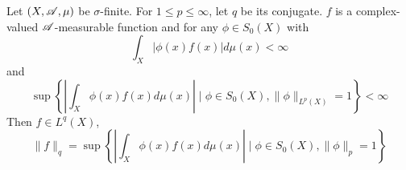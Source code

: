 \begin{thm}\label{thm:mqf}
	Let $(X,\mathscr{A},\mu)$ be $\sigma$-finite. For $1 \leq p \leq \infty$, let $q$ be its conjugate. $f$ is a complex-valued $\mathscr{A}$-measurable function and for any $\phi \in S_0(X)$ with
	\begin{equation*}
		\int_X|\phi(x) f(x)| d \mu(x)<\infty
	\end{equation*}
	and
	\begin{equation*}
		\sup \left\{\left|\int_X \phi(x) f(x) d \mu(x)\right| \mid \phi \in S_0(X),\|\phi\|_{L^p(X)}=1\right\}<\infty
	\end{equation*}
	Then $f \in L^q(X)$,
	\begin{equation*}
		\|f\|_{q}=\sup \left\{\left|\int_X \phi(x) f(x) d \mu(x)\right| \mid \phi \in S_0(X),\|\phi\|_{p}=1\right\}
	\end{equation*}
\end{thm}
